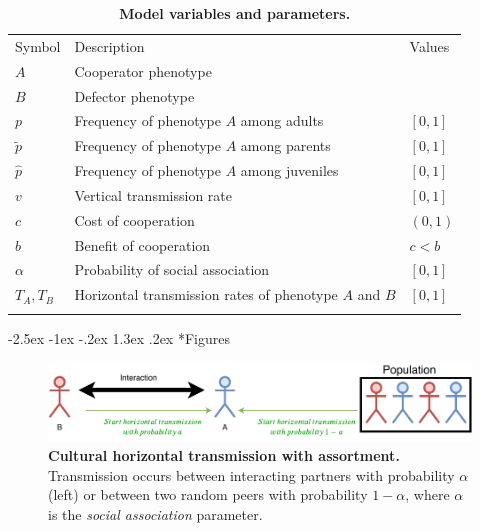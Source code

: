 \documentclass[12pt]{extarticle}
\makeatletter
\renewcommand\section{\@startsection {section}{1}{\z@}%
     {-2.5ex \@plus -1ex \@minus -.2ex}%
     {1.3ex \@plus.2ex}%
    {\Large\bfseries}}
\makeatother
\begin{document}
\bigskip
\begin{table}[h]
\centering
\caption{\textbf{Model variables and parameters.}
}
\begin{tabular}{lll}
\toprule
Symbol & Description & Values \\ \cmidrule(r){1-3}
$A$ & Cooperator phenotype & \\
$B$ & Defector phenotype & \\
$p$ & Frequency of phenotype $A$ among adults & $[0,1]$ \\
$\tilde p$ & Frequency of phenotype $A$ among parents & $[0,1]$ \\
$\hat p$ & Frequency of phenotype $A$ among juveniles & $[0,1]$ \\
$v$ & Vertical transmission rate & $[0,1]$ \\
$c$ & Cost of cooperation & $(0,1)$ \\
$b$ & Benefit of cooperation & $c<b$ \\
$\alpha$ & Probability of social association & $[0,1]$ \\
$T_A, T_B$ & Horizontal transmission rates of phenotype $A$ and $B$ & $[0,1]$ \\
\\ \bottomrule
\end{tabular}
\label{table:vars_params}
\end{table}

\newpage

\section*{Figures}
\begin{figure}[h]
  \centering
  \includegraphics[scale=1]{figure1.pdf}
  \caption{\textbf{Cultural horizontal transmission with assortment.} Transmission occurs between interacting partners with probability $\alpha$ (left) or between two random peers with probability $1-\alpha$, where $\alpha$ is the \emph{social association} parameter.
  }
  \label{fig:horizontal}
\end{figure}


\end{document}
